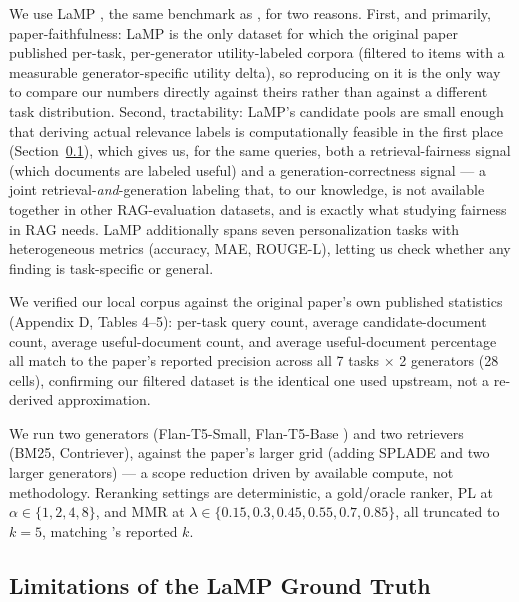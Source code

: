 \documentclass[10pt,twocolumn]{article}
\begin{document}
We use LaMP \cite{salemi2023lamp}, the same benchmark as \cite{eunkim2025fairrag},
for two reasons. First, and primarily, paper-faithfulness: LaMP is the only dataset
for which the original paper published per-task, per-generator utility-labeled
corpora (filtered to items with a measurable generator-specific utility delta), so
reproducing on it is the only way to compare our numbers directly against theirs
rather than against a different task distribution. Second, tractability: LaMP's
candidate pools are small enough that deriving actual relevance labels is
computationally feasible in the first place (Section~\ref{sec:threats}), which gives
us, for the same queries, both a retrieval-fairness signal (which documents are
labeled useful) and a generation-correctness signal --- a joint
retrieval-\emph{and}-generation labeling that,
to our knowledge, is not available together in other RAG-evaluation datasets, and is
exactly what studying fairness in RAG needs. LaMP additionally spans seven
personalization tasks with heterogeneous metrics (accuracy, MAE, ROUGE-L), letting us
check whether any finding is task-specific or general.

We verified our local corpus against the original paper's own published statistics
(Appendix D, Tables 4--5): per-task query count, average candidate-document count,
average useful-document count, and average useful-document percentage all match
to the paper's reported precision across all 7 tasks $\times$ 2 generators (28
cells), confirming our filtered dataset is the identical one used upstream, not a
re-derived approximation.

We run two generators (Flan-T5-Small, Flan-T5-Base \cite{chung2024scaling}) and two
retrievers (BM25, Contriever), against the paper's larger grid (adding SPLADE and
two larger generators) --- a scope reduction driven by available compute, not
methodology. Reranking settings are deterministic, a gold/oracle ranker, PL at
$\alpha \in \{1,2,4,8\}$, and MMR at $\lambda \in \{0.15,0.3,0.45,0.55,0.7,0.85\}$,
all truncated to $k=5$, matching \cite{eunkim2025fairrag}'s reported $k$.

\subsection{Limitations of the LaMP Ground Truth}
\label{sec:threats}
\end{document}
